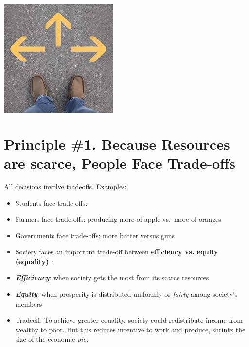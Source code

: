 \documentclass[
]{book}
\begin{document}
\includegraphics[width=\textwidth,height=0.99\textheight]{images/lesson01/fig1a.jpg}

\hypertarget{principle-1.-because-resources-are-scarce-people-face-trade-offs}{%
\section{Principle \#1. Because Resources are scarce, People Face Trade-offs}\label{principle-1.-because-resources-are-scarce-people-face-trade-offs}}

All decisions involve tradeoffs. Examples:

\begin{itemize}
\item
  Students face trade-offs:
\item
  Farmers face trade-offs: producing more of apple vs.~more of oranges
\item
  Governments face trade-offs: more butter versus guns
\item
  Society faces an important trade-off between \textbf{\color{blue} efficiency vs. equity (equality) }:
\item
  \textbf{\emph{Efficiency}}: when society gets the most from its scarce resources
\item
  \textbf{\emph{Equity}}: when prosperity is distributed uniformly or \emph{fairly} among society's members
\item
  Tradeoff: To achieve greater equality, society could redistribute income from wealthy to poor. But this reduces incentive to work and produce, shrinks the size of the economic \emph{pie.}
\end{itemize}
\end{document}
